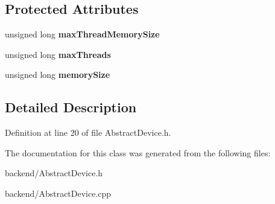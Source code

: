 \subsection*{Protected Attributes}
\begin{DoxyCompactItemize}
\item 
\mbox{\label{classathena_1_1backend_1_1_abstract_device_ac7851210f55e2f709b4ccbd23d9d3f76}} 
unsigned long {\bfseries max\+Thread\+Memory\+Size}
\item 
\mbox{\label{classathena_1_1backend_1_1_abstract_device_ade6690f678a25a634104dca162def5f9}} 
unsigned long {\bfseries max\+Threads}
\item 
\mbox{\label{classathena_1_1backend_1_1_abstract_device_af689d59af9dbf67df30275ab087b006a}} 
unsigned long {\bfseries memory\+Size}
\end{DoxyCompactItemize}


\subsection{Detailed Description}


Definition at line 20 of file Abstract\+Device.\+h.



The documentation for this class was generated from the following files\+:\begin{DoxyCompactItemize}
\item 
backend/Abstract\+Device.\+h\item 
backend/Abstract\+Device.\+cpp\end{DoxyCompactItemize}
